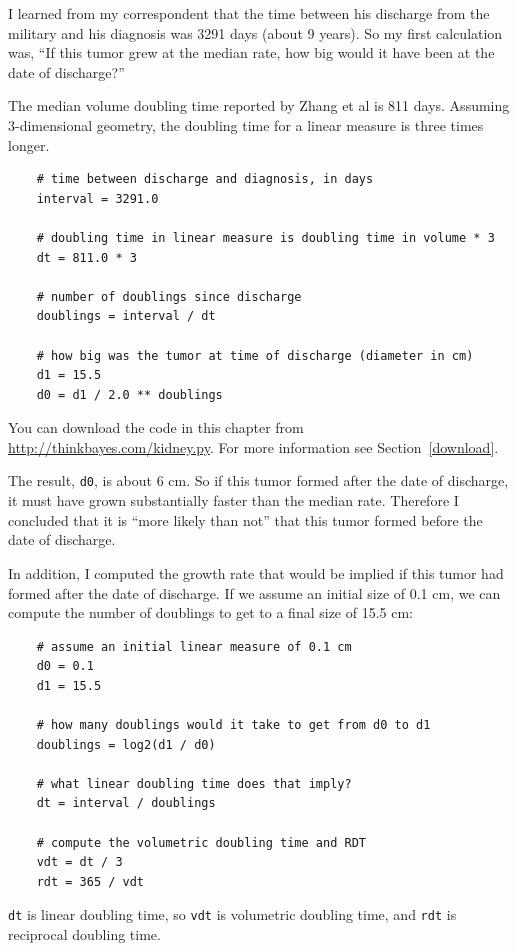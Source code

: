 \documentclass[12pt]{book}
\begin{document}
I learned from my correspondent that the time between his discharge
from the military and his diagnosis was 3291 days (about 9 years).
So my first calculation was, ``If this tumor grew at the median
rate, how big would it have been at the date of discharge?''

The median volume doubling time reported by Zhang et al is 811 days.
Assuming 3-dimensional geometry, the doubling time for a linear
measure is three times longer.

\begin{verbatim}
    # time between discharge and diagnosis, in days 
    interval = 3291.0

    # doubling time in linear measure is doubling time in volume * 3
    dt = 811.0 * 3

    # number of doublings since discharge
    doublings = interval / dt

    # how big was the tumor at time of discharge (diameter in cm)
    d1 = 15.5
    d0 = d1 / 2.0 ** doublings
\end{verbatim}

You can download the code in this chapter from
\url{http://thinkbayes.com/kidney.py}.  For more information
see Section~\ref{download}.

The result, {\tt d0}, is about 6 cm.  So if this tumor formed after
the date of discharge, it must have grown substantially faster than
the median rate.  Therefore I concluded that it is ``more likely than
not'' that this tumor formed before the date of discharge.

In addition, I computed the growth rate that would be implied
if this tumor had formed after the date of discharge.  If we
assume an initial size of 0.1 cm, we can compute the number of
doublings to get to a final size of 15.5 cm:

\begin{verbatim}
    # assume an initial linear measure of 0.1 cm
    d0 = 0.1
    d1 = 15.5

    # how many doublings would it take to get from d0 to d1
    doublings = log2(d1 / d0)

    # what linear doubling time does that imply?
    dt = interval / doublings

    # compute the volumetric doubling time and RDT
    vdt = dt / 3
    rdt = 365 / vdt
\end{verbatim}

{\tt dt} is linear doubling time, so {\tt vdt} is volumetric
doubling time, and {\tt rdt} is reciprocal doubling
time.
\end{document}

